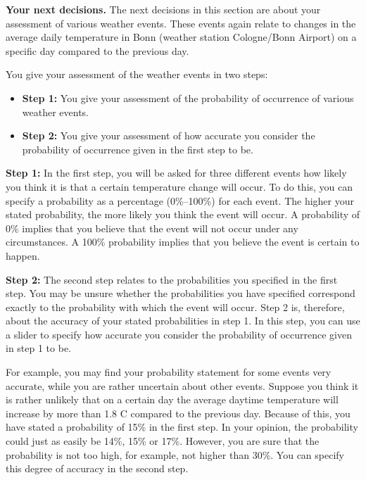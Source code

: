\documentclass[12pt,a4paper]{article}
\newenvironment{original}
  {\par\medskip\noindent\color{black}\ignorespaces}
  {\par\medskip}
\begin{document}
\begin{original}
\textbf{Your next decisions.} The next decisions in this section are about your assessment of various weather events. These events again relate to changes in the average daily temperature in Bonn (weather station Cologne/Bonn Airport) on a specific day compared to the previous day.

You give your assessment of the weather events in two steps:
\begin{itemize}
  \item \textbf{Step 1:} You give your assessment of the probability of occurrence of various weather events.
  \item \textbf{Step 2:} You give your assessment of how accurate you consider the probability of occurrence given in the first step to be.
\end{itemize}

\textbf{Step 1:} In the first step, you will be asked for three different events how likely you think it is that a certain temperature change will occur. To do this, you can specify a probability as a percentage (0\%--100\%) for each event. The higher your stated probability, the more likely you think the event will occur. A probability of 0\% implies that you believe that the event will not occur under any circumstances. A 100\% probability implies that you believe the event is certain to happen.

\textbf{Step 2:} The second step relates to the probabilities you specified in the first step. You may be unsure whether the probabilities you have specified correspond exactly to the probability with which the event will occur. Step 2 is, therefore, about the accuracy of your stated probabilities in step 1. In this step, you can use a slider to specify how accurate you consider the probability of occurrence given in step 1 to be.

For example, you may find your probability statement for some events very accurate, while you are rather uncertain about other events. Suppose you think it is rather unlikely that on a certain day the average daytime temperature will increase by more than 1.8 C compared to the previous day. Because of this, you have stated a probability of 15\% in the first step. In your opinion, the probability could just as easily be 14\%, 15\% or 17\%. However, you are sure that the probability is not too high, for example, not higher than 30\%. You can specify this degree of accuracy in the second step.
\end{original}
\end{document}
